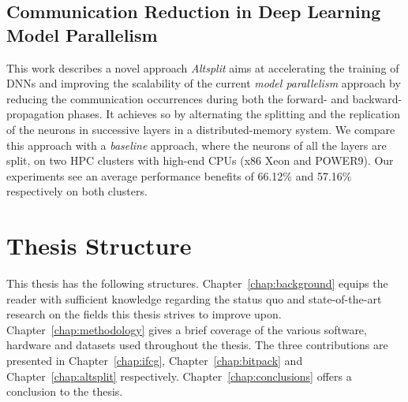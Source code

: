 \subsection{Communication Reduction in Deep Learning Model Parallelism}
This work describes a novel approach \emph{Altsplit} aims at accelerating the
training of DNNs and improving the scalability of the current \emph{model 
parallelism} approach by reducing the communication occurrences during both the
forward- and backward- propagation phases. It achieves so by alternating the
splitting and the replication of the neurons in successive layers in a
distributed-memory system. We compare this approach with a \emph{baseline}
approach, where the neurons of all the layers are split, on two HPC clusters
with high-end CPUs (x86 Xeon and POWER9). Our experiments see an average
performance benefits of 66.12\% and 57.16\% respectively on both clusters.

\section{Thesis Structure}
This thesis has the following structures. Chapter~\ref{chap:background} equips
the reader with sufficient knowledge regarding the status quo and state-of-the-art
research on the fields this thesis strives to improve upon. Chapter~\ref{chap:methodology}
gives a brief coverage of the various software, hardware and datasets used throughout the 
thesis. The three contributions are presented in Chapter~\ref{chap:ifcg}, Chapter~\ref{chap:bitpack}
and Chapter~\ref{chap:altsplit} respectively. Chapter~\ref{chap:conclusions} offers a
conclusion to the thesis.